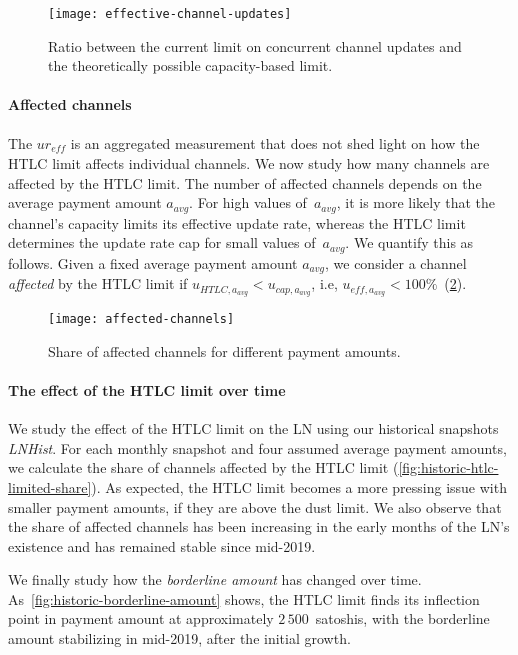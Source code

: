 \begin{figure}[tb]
	\centering
	\texttt{[image: effective-channel-updates]}
	\caption{Ratio between the current limit on concurrent channel updates and the theoretically possible capacity-based limit.}
	\label{fig:effective-channel-updates}
\end{figure}

\paragraph{Affected channels}
The $ur_\textit{eff}$ is an aggregated measurement that does not shed light on how the HTLC limit affects individual channels.
We now study how many channels are affected by the HTLC limit.
The number of affected channels depends on the average payment amount $a_\textit{avg}$.
For high values of~$a_\textit{avg}$, it is more likely that the channel's capacity limits its effective update rate, whereas the HTLC limit determines the update rate cap for small values of~$a_\textit{avg}$.
We quantify this as follows.
Given a fixed average payment amount $a_\textit{avg}$, we consider a channel \textit{affected} by the HTLC limit if $u_{\textit{HTLC},a_\textit{avg}} < u_{\textit{cap},a_\textit{avg}}$, i.e, $u_{\textit{eff},a_\textit{avg}} < 100\%$~(\cref{fig:affected-channels}).

\begin{figure}[tb]
	\centering
	\texttt{[image: affected-channels]}
	\caption{Share of affected channels for different payment amounts.}
	\label{fig:affected-channels}
\end{figure}


\paragraph{The effect of the HTLC limit over time}

We study the effect of the HTLC limit on the LN using our historical snapshots \emph{LNHist}.
For each monthly snapshot and four assumed average payment amounts, we calculate the share of channels affected by the HTLC limit (\cref{fig:historic-htlc-limited-share}).
As expected, the HTLC limit becomes a more pressing issue with smaller payment amounts, if they are above the dust limit.
We also observe that the share of affected channels has been increasing in the early months of the LN's existence and has remained stable since mid-2019.

We finally study how the \textit{borderline amount} has changed over time.
As~\cref{fig:historic-borderline-amount} shows, the HTLC limit finds its inflection point in payment amount at approximately $2\,500$~satoshis, with the borderline amount stabilizing in mid-2019, after the initial growth.

